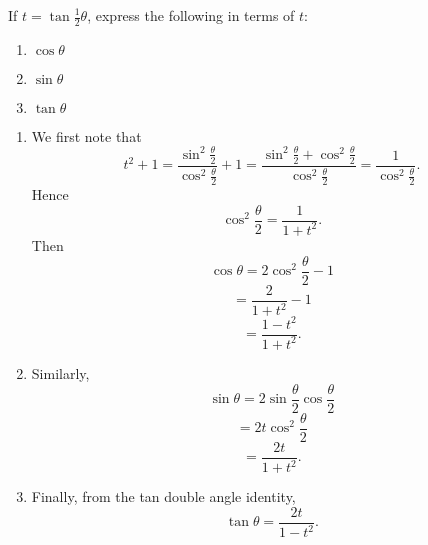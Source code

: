 If $t = \tan \frac{1}{2}\theta$, express the following in terms of $t$: 
\begin{enumerate}
\item
$\cos \theta$
\item
$\sin \theta$
\item
$\tan \theta$
\end{enumerate}
\begin{enumerate}
\item
We first note that
\[
t^2 + 1 = \frac{\sin^2\frac{\theta}{2}}{\cos^2\frac{\theta}{2}} + 1 = \frac{\sin^2\frac{\theta}{2} + \cos^2\frac{\theta}{2}}{\cos^2\frac{\theta}{2}} = \frac{1}{\cos^2\frac{\theta}{2}}.
\]
Hence
\[
\cos^2\frac{\theta}{2} = \frac{1}{1+t^2}.
\]
Then
\[
\cos\theta = 2\cos^2\frac{\theta}{2}-1
\]
\[
=\frac{2}{1+t^2}-1 
\]
\[
= \frac{1-t^2}{1+t^2}.
\]
\item
Similarly,
\[
\sin\theta = 2\sin\frac{\theta}{2}\cos\frac{\theta}{2}
\]
\[
= 2t\cos^2\frac{\theta}{2}
\]
\[
= \frac{2t}{1+t^2}.
\]
\item
Finally, from the tan double angle identity,
\[
\tan\theta = \frac{2t}{1-t^2}.
\]
\end{enumerate}
